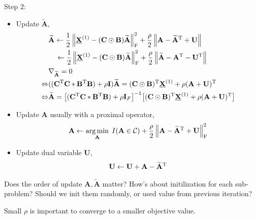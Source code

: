 \documentclass[11pt,a4paper]{article}
\def\blue{\color{blue}}
\newcommand{\norm}[1]{\left\lVert#1\right\rVert}
\DeclareMathOperator*{\argmin}{arg\,min}
\theoremstyle{plain}
\theoremstyle{definition}
\theoremstyle{remark}
\begin{document}
Step 2:
\begin{itemize}
    \item Update $\widetilde{\mathbf{A}}$,
        \begin{align*}
            & \widetilde{\mathbf{A}} \leftarrow \dfrac{1}{2} \norm{\underline{\mathbf{X}}^{(1)} - (\mathbf{C} \odot \mathbf{B}) \widetilde{\mathbf{A}}}_{\rm F}^2 + \dfrac{\rho}{2} \norm{\mathbf{A} - \widetilde{\mathbf{A}}^{\rm T}  + \mathbf{U}} \\ 
            & \quad \leftarrow \dfrac{1}{2} \norm{\underline{\mathbf{X}}^{(1)} - (\mathbf{C} \odot \mathbf{B}) \widetilde{\mathbf{A}}}_{\rm F}^2 + \dfrac{\rho}{2} \norm{\widetilde{\mathbf{A}} - \mathbf{A}^{\rm T}  - \mathbf{U}^{\rm T} } \\ 
        & \nabla_{\widetilde{\mathbf{A}}} = 0 \\
        \Leftrightarrow & ((\mathbf{C}^{\rm T} \mathbf{C} * \mathbf{B}^{\rm T} \mathbf{B}) + \rho \mathbf{I}) \widetilde{\mathbf{A}} = (\mathbf{C} \odot \mathbf{B})^{\rm T} \underline{\mathbf{X}}^{(1)} + \rho (\mathbf{A} + \mathbf{U})^{\rm T}  \\
        \Leftrightarrow & \widetilde{\mathbf{A}} = \big[(\mathbf{C}^{\rm T} \mathbf{C} * \mathbf{B}^{\rm T} \mathbf{B}) + \rho \mathbf{I}_F \big]^{-1} \big[(\mathbf{C} \odot \mathbf{B})^{\rm T} \underline{\mathbf{X}}^{(1)} + \rho (\mathbf{A} + \mathbf{U})^{\rm T} \big]
        \end{align*}
    \item Update $\mathbf{A}$ usually with a proximal operator,
        \begin{align*}
        \mathbf{A} \leftarrow \argmin_{\mathbf{A}} \; I(\mathbf{A} \in \mathcal{C}) + \dfrac{\rho}{2} \norm{\mathbf{A} - \widetilde{\mathbf{A}}^{\rm T} + \mathbf{U} }_{\rm F}^2
        \end{align*}
    \item Update dual variable $\mathbf{U}$,
        \begin{align*}
        \mathbf{U} \leftarrow \mathbf{U} + \mathbf{A} - \widetilde{\mathbf{A}}^{\rm T} 
        \end{align*}
\end{itemize}
{\blue Does the order of update $\mathbf{A}, \widetilde{\mathbf{A}}$ matter? How's about initilization for each sub-problem? Should we init them randomly, or used value from previous iteration?}

Small $\rho$ is important to converge to a smaller objective value.
\end{document}
